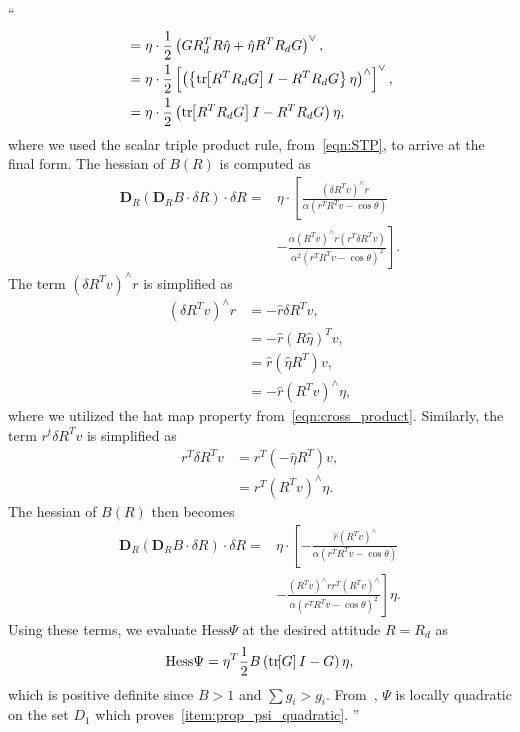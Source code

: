 \documentclass[11pt]{article}
\newcommand{\bracket}[1]{\ensuremath{\left[ #1 \right]}}
\newcommand{\braces}[1]{\ensuremath{\left\{ #1 \right\}}}
\newcommand{\parenth}[1]{\ensuremath{\left( #1 \right)}}
\newcommand{\tr}[1]{\mathrm{tr}\ensuremath{\negthickspace\bracket{#1}}}
\newcommand{\dirDiff}[2]{\ensuremath{\mathbf{D}_{#2} #1 \cdot \delta #2}} %
\newcommand{\Hess}{\ensuremath{\mathrm{Hess}}}
\newenvironment{correction}{\begin{list}{}{\setlength{\leftmargin}{1cm}\setlength{\rightmargin}{1cm}}\vspace{\parsep}\item[]``}{''\end{list}}
\begin{document}
\begin{enumerate}
\begin{correction}
\begin{align*}
        &= \eta \cdot \frac{1}{2} \parenth{G R_d^T R \hat \eta + \hat \eta R^T R_d G}^\vee,\\
        &= \eta \cdot \frac{1}{2} \bracket{\parenth{\braces{\tr{R^T R_d G} I - R^T R_d G} \eta}^\wedge}^\vee , \\
        &= \eta \cdot \frac{1}{2} \parenth{\tr{R^T R_d G} I - R^T R_d G}\eta ,
    \end{align*}
    where we used the scalar triple product rule, from~\cref{eqn:STP}, to arrive at the final form.
    The hessian of \( B(R) \) is computed as
    \begin{align*}
        \dirDiff{\parenth{\dirDiff{B}{R}}}{R} =& \eta \cdot \left[\frac{\parenth{\delta R^T v}^\wedge r}{\alpha\parenth{r^T R^T v - \cos \theta}} \right. \\
        & \left. - \frac{\alpha \parenth{R^T v}^\wedge r \parenth{r^T \delta R^T v}}{\alpha^2 \parenth{r^TR^Tv - \cos \theta}^2}   \right] .
    \end{align*}
    The term \( \parenth{\delta R^T v}^\wedge r\) is simplified as
    \begin{align*}
        \parenth{\delta R^T v}^\wedge r &= - \hat{r} \delta R ^T v , \\
        &= - \hat{r} \parenth{R \hat \eta}^T v , \\
        &= \hat{r} \parenth{\hat{\eta} R^T } v , \\
        &= - \hat{r} \parenth{R^T v}^\wedge \eta ,
    \end{align*}
    where we utilized the hat map property from~\cref{eqn:cross_product}.
    Similarly, the term \( r^t \delta R^T v \) is simplified as
    \begin{align*}
        r^T \delta R^T v &= r^T \parenth{-\hat \eta R^T}v , \\
        &= r^T \parenth{R^T v}^\wedge \eta .
    \end{align*}
    The hessian of \( B(R) \) then becomes
    \begin{align*}
        \dirDiff{\parenth{\dirDiff{B}{R}}}{R} =& \eta \cdot \left[ - \frac{ \hat r \parenth{R^T v}^\wedge}{\alpha \parenth{r^T R^T v - \cos \theta}} \right. \\ 
        & \left. - \frac{\parenth{R^T v}^\wedge r r^T \parenth{R^T v}^\wedge }{ \alpha\parenth{r^T R^T v - \cos \theta}^2}  \right] \eta .
    \end{align*}
    Using these terms, we evaluate \( \Hess{\Psi} \) at the desired attitude \( R = R_d \) as
    \begin{align*}
        \Hess{\Psi} = \eta^T \frac{1}{2} B \parenth{\tr{G}I -  G} \eta , 
    \end{align*}
    which is positive definite since \( B > 1\) and \( \sum g_i > g_i\). 
    From~\cite[Proposition 6.30]{bullo2004}, \( \Psi \) is locally quadratic on the set \( D_1 \) which proves~\cref{item:prop_psi_quadratic}.
\end{correction}


\end{enumerate}
\end{document}
